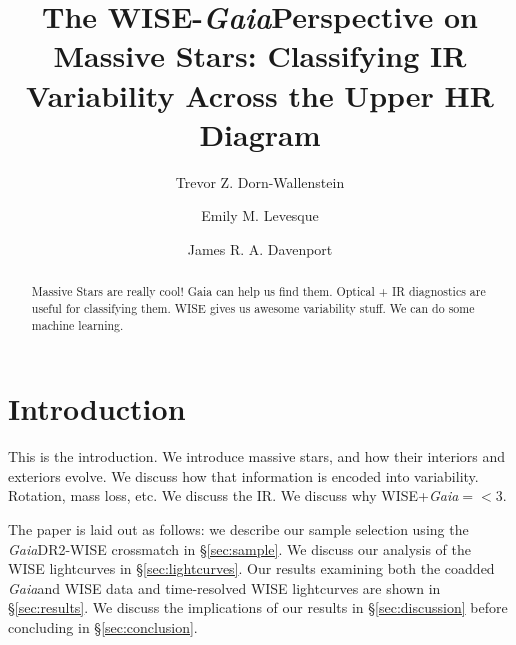 \documentclass[twocolumn]{aastex62}
\newcommand\Gaia{{\it Gaia}}
\begin{document}
\title{The WISE-\Gaia Perspective on Massive Stars: Classifying IR Variability Across the Upper HR Diagram}


\author[0000-0003-3601-3180]{Trevor Z. Dorn-Wallenstein}

\author[0000-0003-2184-1581]{Emily M. Levesque}

\author[0000-0002-0637-835X]{James R. A. Davenport}

\begin{abstract}

Massive Stars are really cool! Gaia can help us find them. Optical + IR diagnostics are useful for classifying them. WISE gives us awesome variability stuff. We can do some machine learning.


\end{abstract}


\section{Introduction} \label{sec:intro}

This is the introduction. We introduce massive stars, and how their interiors and exteriors evolve. We discuss how that information is encoded into variability. Rotation, mass loss, etc. We discuss the IR. We discuss why WISE+\Gaia$ = <3$.

The paper is laid out as follows: we describe our sample selection using the \Gaia DR2-WISE crossmatch in \S\ref{sec:sample}. We discuss our analysis of the WISE lightcurves in \S\ref{sec:lightcurves}. Our results examining both the coadded \Gaia and WISE data and time-resolved WISE lightcurves are shown in \S\ref{sec:results}. We discuss the implications of our results in \S\ref{sec:discussion} before concluding in \S\ref{sec:conclusion}.
\end{document}
